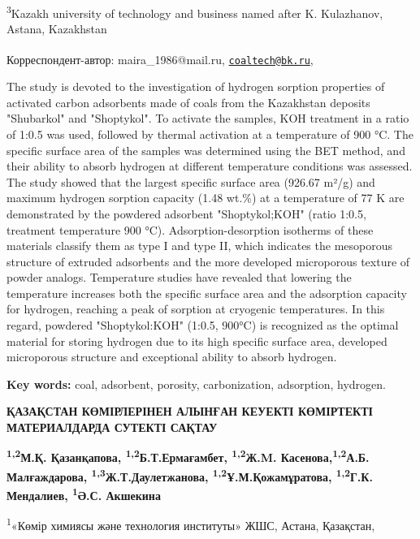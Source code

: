 \textsuperscript{3}Kazakh university of technology and business named
after K. Kulazhanov, Astana, Kazakhstan

{\bfseries \textsuperscript{\envelope }}Корреспондент-автор: maira\_1986@mail.ru,
\href{mailto:coaltech@bk.ru}{\nolinkurl{coaltech@bk.ru}},

The study is devoted to the investigation of hydrogen sorption
properties of activated carbon adsorbents made of coals from the
Kazakhstan deposits "Shubarkol" and "Shoptykol". To activate the
samples, KOH treatment in a ratio of 1:0.5 was used, followed by thermal
activation at a temperature of 900 °C. The specific surface area of
\hspace{0pt}\hspace{0pt}the samples was determined using the BET method,
and their ability to absorb hydrogen at different temperature conditions
was assessed. The study showed that the largest specific surface area
(926.67 m²/g) and maximum hydrogen sorption capacity (1.48 wt.\%) at a
temperature of 77 K are demonstrated by the powdered adsorbent
"Shoptykol;KOH" (ratio 1:0.5, treatment temperature 900 °C).
Adsorption-desorption isotherms of these materials classify them as type
I and type II, which indicates the mesoporous structure of extruded
adsorbents and the more developed microporous texture of powder analogs.
Temperature studies have revealed that lowering the temperature
increases both the specific surface area and the adsorption capacity for
hydrogen, reaching a peak of sorption at cryogenic temperatures. In this
regard, powdered "Shoptykol:KOH" (1:0.5, 900°C) is recognized as the
optimal material for storing hydrogen due to its high specific surface
area, developed microporous structure and exceptional ability to absorb
hydrogen.

{\bfseries Key words:} coal, adsorbent, porosity, carbonization,
adsorption, hydrogen.

{\bfseries ҚАЗАҚСТАН КӨМІРЛЕРІНЕН АЛЫНҒАН КЕУЕКТІ КӨМІРТЕКТІ МАТЕРИАЛДАРДА
СУТЕКТІ САҚТАУ}

{\bfseries \textsuperscript{1,2}М.Қ. Қазанқапова\textsuperscript{\envelope },
\textsuperscript{1,2}Б.Т.Ермағамбет, \textsuperscript{1,2}Ж.M.
Касенова,\textsuperscript{1,2}А.Б. Малғаждарова,
\textsuperscript{1,3}Ж.Т.Даулетжанова,
\textsuperscript{1,2}Ұ.М.Қожамұратова, \textsuperscript{1,2}Г.К.
Мендалиев, \textsuperscript{1}Ә.С. Акшекина}

\textsuperscript{1}«Көмір химиясы және технология институты» ЖШС,
Астана, Қазақстан,

